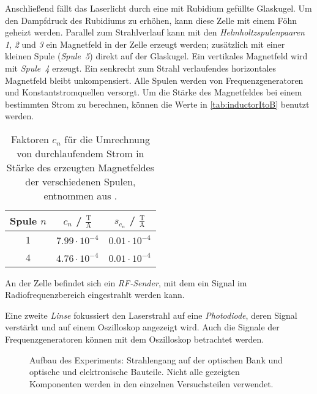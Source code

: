 Anschließend fällt das Laserlicht durch eine mit Rubidium gefüllte Glaskugel.
Um den Dampfdruck des Rubidiums zu erhöhen, kann diese Zelle mit einem Föhn geheizt werden.
Parallel zum Strahlverlauf kann mit den \emph{Helmholtzspulenpaaren 1}, \emph{2} und \emph{3}
ein Magnetfeld in der Zelle erzeugt werden;
zusätzlich mit einer kleinen Spule (\emph{Spule~5}) direkt auf der Glaskugel.
Ein vertikales Magnetfeld wird mit \emph{Spule~4} erzeugt.
Ein senkrecht zum Strahl verlaufendes horizontales Magnetfeld bleibt unkompensiert.
Alle Spulen werden von Frequenzgeneratoren und Konstantstromquellen versorgt.
Um die Stärke des Magnetfeldes bei einem bestimmten Strom zu berechnen, können die Werte in \autoref{tab:inductorItoB} benutzt werden.
\begin{table}[H]
    \caption{Faktoren $c_n$ für die Umrechnung von durchlaufendem Strom in Stärke des erzeugten Magnetfeldes der verschiedenen Spulen,
    entnommen aus \cite{manual}.}
    \begin{center}
        \begin{tabular}{|c|c|c|}
            \hline
            Spule $n$	& $c_n$ / $\frac{\text{T}}{\text{A}}$	& $s_{c_n}$ / $\frac{\text{T}}{\text{A}}$	\\ \hline
         	1			& $7.99 \cdot 10^{-4}$					& $0.01 \cdot 10^{-4}$						\\ \hline
			4			& $4.76 \cdot 10^{-4}$					& $0.01 \cdot 10^{-4}$						\\ \hline
        \end{tabular}
    \end{center}
    \label{tab:inductorItoB}
\end{table}

An der Zelle befindet sich ein \emph{RF-Sender}, mit dem ein Signal im Radiofrequenzbereich eingestrahlt werden kann.

Eine zweite \emph{Linse} fokussiert den Laserstrahl auf eine \emph{Photodiode}, deren Signal verstärkt und auf
einem Oszilloskop angezeigt wird.
Auch die Signale der Frequenzgeneratoren können mit dem Oszilloskop betrachtet werden.


\begin{landscape}

\begin{figure}[H]
    \def\svgwidth{1.4\textwidth}
    
    \caption{Aufbau des Experiments: Strahlengang auf der optischen Bank
    und optische und elektronische Bauteile.
    Nicht alle gezeigten Komponenten werden in den einzelnen
    Versuchsteilen verwendet.}
    \label{img:aufbau}
\end{figure}

\end{landscape}
